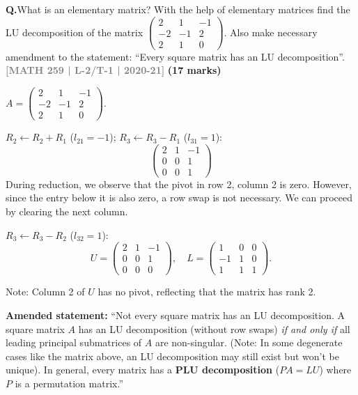 \documentclass[12pt,a3paper]{article}
\newcommand{\yr}[1]{\hfill\textcolor{gray}{\small\textbf{[#1]}}}
\newcommand{\mk}[1]{\textcolor{orange!70!black}{\small\textbf{(#1 marks)}}}
\newcounter{qnum}
\newcommand{\Q}[1]{%
  \needspace{4\baselineskip}
  \refstepcounter{qnum}
  \vspace{6pt}
  \noindent\textbf{Q\theqnum.}\enspace #1\par
}
\begin{document}
\Q{What is an elementary matrix? With the help of elementary matrices find the LU decomposition of the matrix $\begin{pmatrix} 2 & 1 & -1 \\ -2 & -1 & 2 \\ 2 & 1 & 0 \end{pmatrix}$. Also make necessary amendment to the statement: ``Every square matrix has an LU decomposition''.
\yr{MATH 259 | L-2/T-1 | 2020-21} \mk{17}}

\begin{tcolorbox}[enhanced,breakable,
  colback=cB!4,colframe=cB,boxrule=0.8pt,arc=5pt,
  title={\textbf{Answer --- LU Decomposition; Amendment to LU Existence Statement}},
  fonttitle=\bfseries\color{white},colbacktitle=cB]

$A=\begin{pmatrix}2&1&-1\\-2&-1&2\\2&1&0\end{pmatrix}$.

$R_2\leftarrow R_2+R_1$ ($l_{21}=-1$); $R_3\leftarrow R_3-R_1$ ($l_{31}=1$):
\[
\begin{pmatrix}2&1&-1\\0&0&1\\0&0&1\end{pmatrix}
\]
During reduction, we observe that the pivot in row 2, column 2 is zero. However, since the entry below it is also zero, a row swap is not necessary. We can proceed by clearing the next column.

$R_3\leftarrow R_3-R_2$ ($l_{32}=1$):
\[
U=\begin{pmatrix}2&1&-1\\0&0&1\\0&0&0\end{pmatrix},\quad
L=\begin{pmatrix}1&0&0\\-1&1&0\\1&1&1\end{pmatrix}.
\]

Note: Column 2 of $U$ has no pivot, reflecting that the matrix has rank 2.

\medskip
\textbf{Amended statement:} ``Not every square matrix has an LU decomposition. A square matrix $A$ has an LU decomposition (without row swaps) \emph{if and only if} all leading principal submatrices of $A$ are non-singular. (Note: In some degenerate cases like the matrix above, an LU decomposition may still exist but won't be unique). In general, every matrix has a \textbf{PLU decomposition} ($PA=LU$) where $P$ is a permutation matrix.''

\end{tcolorbox}
\end{document}
